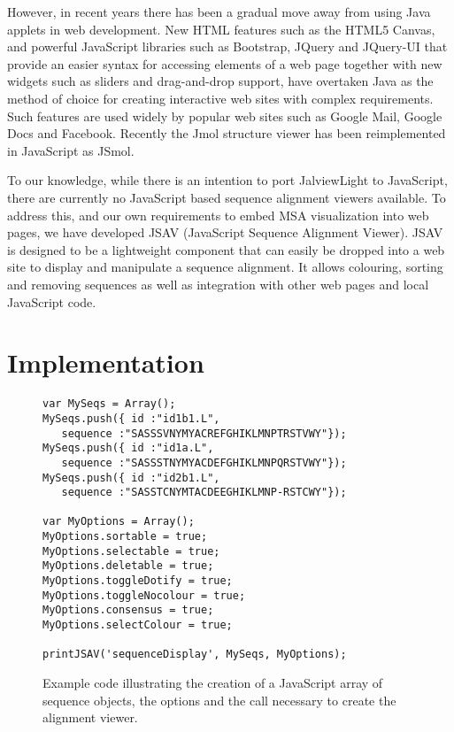 \documentclass[a4]{bioinfo}
\begin{document}
However, in recent years there has been a gradual move away from using
Java applets in web development. New HTML features such as the HTML5
Canvas, and powerful JavaScript libraries such as Bootstrap, JQuery
and JQuery-UI that provide an easier syntax for accessing elements of
a web page together with new widgets such as sliders and drag-and-drop
support, have overtaken Java as the method of choice for creating
interactive web sites with complex requirements. Such features are
used widely by popular web sites such as Google Mail, Google Docs and
Facebook.  Recently the Jmol structure viewer has been reimplemented
in JavaScript as JSmol.

To our knowledge, while there is an intention to port JalviewLight to
JavaScript, there are currently no JavaScript based sequence alignment
viewers available. To address this, and our own requirements to embed
MSA visualization into web pages, we have developed JSAV (JavaScript
Sequence Alignment Viewer). JSAV is designed to be a lightweight
component that can easily be dropped into a web site to display and
manipulate a sequence alignment. It allows colouring, sorting and
removing sequences as well as integration with other web pages and
local JavaScript code.



\section{Implementation}

\begin{figure}
\footnotesize
\begin{verbatim}
var MySeqs = Array();
MySeqs.push({ id :"id1b1.L",  
   sequence :"SASSSVNYMYACREFGHIKLMNPTRSTVWY"});
MySeqs.push({ id :"id1a.L",   
   sequence :"SASSSTNYMYACDEFGHIKLMNPQRSTVWY"});
MySeqs.push({ id :"id2b1.L",  
   sequence :"SASSTCNYMTACDEEGHIKLMNP-RSTCWY"});

var MyOptions = Array();
MyOptions.sortable = true;
MyOptions.selectable = true;
MyOptions.deletable = true;
MyOptions.toggleDotify = true;
MyOptions.toggleNocolour = true;
MyOptions.consensus = true;
MyOptions.selectColour = true;

printJSAV('sequenceDisplay', MySeqs, MyOptions);
\end{verbatim}
\caption{\label{fig:code}Example code illustrating the creation of a
JavaScript array of sequence objects, the options and the call
necessary to create the alignment viewer.}
\end{figure}
\end{document}
